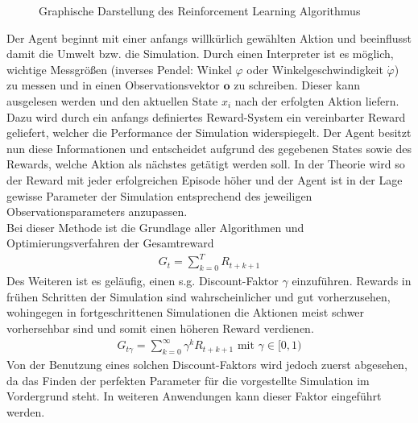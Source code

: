 	\begin{figure}[H] %
		\centering
		\def\svgwidth{12cm}
		
		\caption{Graphische Darstellung des Reinforcement Learning Algorithmus}
		\label{fig:rl_chart}
	\end{figure}
	Der Agent beginnt mit einer anfangs willkürlich gewählten Aktion und beeinflusst damit die Umwelt bzw. die Simulation. Durch einen Interpreter ist es möglich, wichtige Messgrößen (inverses Pendel: Winkel $\varphi$ oder Winkelgeschwindigkeit $\dot{\varphi}$) zu messen und in einen Observationsvektor $\textbf{o}$ zu schreiben. Dieser kann ausgelesen werden und den aktuellen State $x_i$ nach der erfolgten Aktion liefern. Dazu wird durch ein anfangs definiertes Reward-System ein vereinbarter Reward geliefert, welcher die Performance der Simulation widerspiegelt. Der Agent besitzt nun diese Informationen und entscheidet aufgrund des gegebenen States sowie des Rewards, welche Aktion als nächstes getätigt werden soll. In der Theorie wird so der Reward mit jeder erfolgreichen Episode höher und der Agent ist in der Lage gewisse Parameter der Simulation entsprechend des jeweiligen Observationsparameters anzupassen.\\
	Bei dieser Methode ist die Grundlage aller Algorithmen und Optimierungsverfahren der Gesamtreward
	\begin{align}
		G_t = \sum_{k=0}^{T}R_{t+k+1}
	\end{align}
	Des Weiteren ist es geläufig, einen s.g. \glqq Discount-Faktor\grqq{} $\gamma$ einzuführen. Rewards in frühen Schritten der Simulation sind wahrscheinlicher und gut vorherzusehen, wohingegen in fortgeschrittenen Simulationen die Aktionen meist schwer vorhersehbar sind und somit einen höheren Reward verdienen.
	\begin{align}
		G_{t\gamma} = \sum_{k=0}^{\infty}\gamma^k R_{t+k+1}\text{ mit }\gamma\in[0,1)
	\end{align}
	Von der Benutzung eines solchen Discount-Faktors wird jedoch zuerst abgesehen, da das Finden der perfekten Parameter für die vorgestellte Simulation im Vordergrund steht. In weiteren Anwendungen kann dieser Faktor eingeführt werden.
	
	
